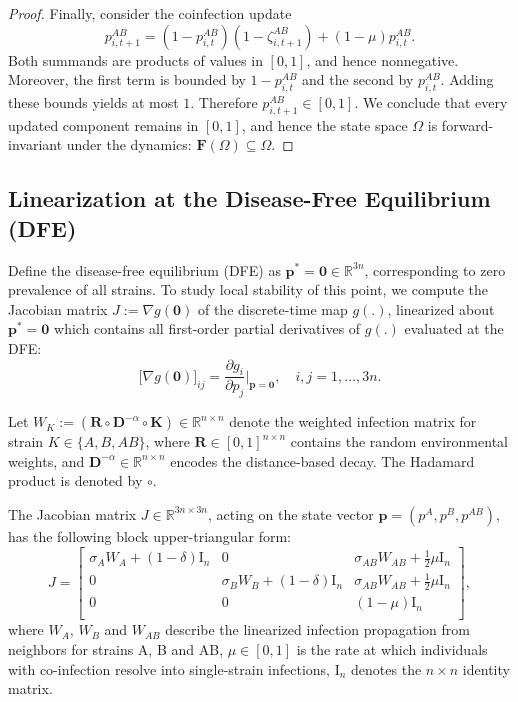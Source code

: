 \documentclass[a4paper,12pt]{scrartcl}
\theoremstyle{plain}%
\theoremstyle{definition}
\theoremstyle{remark}
\numberwithin{equation}{section}
\begin{document}
\begin{proof} {}
Finally, consider the coinfection update  
\[
p_{i,t+1}^{AB} = (1 - p_{i,t}^{AB})(1 - \zeta_{i,t+1}^{AB}) + (1-\mu)p_{i,t}^{AB}.
\]  
Both summands are products of values in \([0,1]\), and hence nonnegative. Moreover, the first term is bounded by \(1-p_{i,t}^{AB}\) and the second by \(p_{i,t}^{AB}\). Adding these bounds yields at most \(1\). Therefore \(p_{i,t+1}^{AB} \in [0,1]\).  We conclude that every updated component remains in \([0,1]\), and hence the state space \(\Omega\) is forward-invariant under the dynamics: \(\mathbf{F}(\Omega) \subseteq \Omega\).  
\end{proof}

\subsection{Linearization at the Disease-Free Equilibrium (DFE)}

Define the disease-free equilibrium (DFE) as \( \mathbf{p}^* = \mathbf{0} \in \mathbb{R}^{3n} \), corresponding to zero prevalence of all strains. To study local stability of this point, we compute the Jacobian matrix \( J := \nabla g(\mathbf{0}) \) of the discrete-time map \( g(.) \), linearized about \( \mathbf{p}^* = \mathbf{0} \) which contains all first-order partial derivatives of $g(.)$ evaluated at the DFE:
\[
\big[\nabla g(\mathbf{0})\big]_{ij} = 
\frac{\partial g_i}{\partial p_j} \Big|_{\mathbf{p} = \mathbf{0}}, 
\quad i,j = 1, \dots, 3n.
\]

Let \( W_K := (\mathbf{R} \circ \mathbf{D}^{-\alpha} \circ \mathbf{K}) \in \mathbb{R}^{n \times n} \) denote the weighted infection matrix for strain \( K \in \{A, B, AB\} \), where \( \mathbf{R} \in [0,1]^{n \times n} \) contains the random environmental weights, and \( \mathbf{D}^{-\alpha} \in \mathbb{R}^{n \times n} \) encodes the distance-based decay. The Hadamard product is denoted by \( \circ \).

The Jacobian matrix \( J \in \mathbb{R}^{3n \times 3n} \), acting on the state vector \( \mathbf{p} = (p^A, p^B, p^{AB}) \), has the following block upper-triangular form:
\[
J =
\begin{bmatrix}
\sigma_A W_A + (1-\delta) \mathrm{I}_n & 0 & \sigma_{AB} W_{AB} + \frac{1}{2}\mu \mathrm{I}_n\\
0 & \sigma_B W_B + (1-\delta) \mathrm{I}_n &  \sigma_{AB} W_{AB} + \frac{1}{2} \mu \mathrm{I}_n\\
0 & 0 & (1 - \mu) \mathrm{I}_n \\
\end{bmatrix},
\]
where \( W_A \), \( W_B \)  and \( W_{AB} \) describe the linearized infection propagation from neighbors for strains A, B and AB, \( \mu \in [0,1] \) is the rate at which individuals with co-infection resolve into single-strain infections, \( \mathrm{I}_n \) denotes the \( n \times n \) identity matrix.
\end{document}
